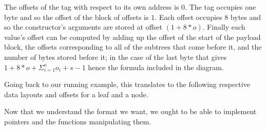 The offsets of the tag with respect to its own address is $0$.
The tag occupies one byte and so the offset of the block of offsets is $1$.
Each offset occupies 8 bytes and so the constructor's arguments are stored at offset $(1+8*o)$.
Finally each value's offset can be computed by adding up the offset of the
start of the payload block, the offsets corresponding to all of the subtrees
that come before it, and the number of bytes stored before it;
in the case of the last byte that gives $1+8*o + \Sigma_{i=1}^{o}o_i + s-1$
hence the formula included in the diagram.

Going back to our running example, this translates to the following
respective data layouts and offsets for a leaf and a node.

\begin{center}
  
\end{center}

Now that we understand the format we want, we ought to be able to implement pointers
and the functions manipulating them.
